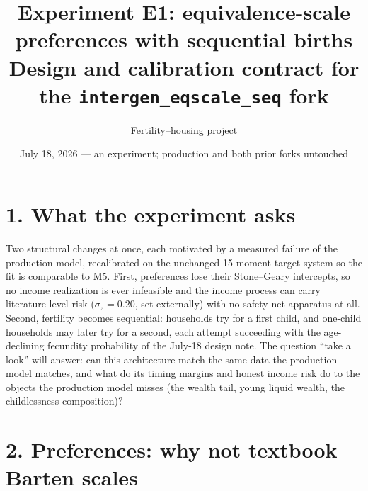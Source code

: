 \documentclass[11pt]{article}
\title{\vspace{-1.4em}\textbf{Experiment E1: equivalence-scale preferences with sequential births}\\[2pt]
\large Design and calibration contract for the \texttt{intergen\_eqscale\_seq} fork}
\author{Fertility--housing project}
\date{July 18, 2026 --- an experiment; production and both prior forks untouched}
\begin{document}
\maketitle
\vspace{-1.4em}

\section*{1. What the experiment asks}

Two structural changes at once, each motivated by a measured failure of the
production model, recalibrated on the unchanged 15-moment target system so
the fit is comparable to M5. First, preferences lose their Stone--Geary
intercepts, so no income realization is ever infeasible and the income
process can carry literature-level risk ($\sigma_z=0.20$, set externally)
with no safety-net apparatus at all. Second, fertility becomes sequential:
households try for a first child, and one-child households may later try
for a second, each attempt succeeding with the age-declining fecundity
probability of the July-18 design note. The question ``take a look'' will
answer: can this architecture match the same data the production model
matches, and what do its timing margins and honest income risk do to the
objects the production model misses (the wealth tail, young liquid wealth,
the childlessness composition)?

\section*{2. Preferences: why not textbook Barten scales}
\end{document}
